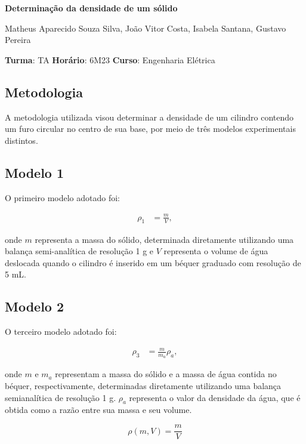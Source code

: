 \documentclass{article}
\begin{document}
\begin{center}
    \huge
    \textbf{Determinação da densidade de um sólido}
    \normalsize
    \vspace{10pt}

    Matheus Aparecido Souza Silva, João Vitor Costa, Isabela Santana, Gustavo Pereira
    \vspace{5pt}

    \textbf{Turma}: TA \textbf{Horário}: 6M23 \textbf{Curso}: Engenharia Elétrica
\end{center}

\begin{multicols}{2}

\section{Metodologia}

A metodologia utilizada visou determinar a densidade de um cilindro contendo um furo circular no centro de sua base, por meio de três modelos experimentais distintos.

\subsection{Modelo 1}
O primeiro modelo adotado foi:

\begin{align}
\rho_1 &= \frac{m}{V},
\end{align}

onde $m$ representa a massa do sólido, determinada diretamente utilizando uma balança semi-analítica de resolução 1 g e $V$ representa o volume de água deslocada quando o cilindro é inserido em um béquer graduado com resolução de 5 mL.

\subsection{Modelo 2}
O terceiro modelo adotado foi:

\begin{align}
\rho_3 &= \frac{m}{m_a} \rho_a,
\end{align}

onde $m$ e $m_a$ representam a massa do sólido e a massa de água contida no béquer, respectivamente, determinadas diretamente utilizando uma balança semianalítica de resolução 1 g. $\rho_a$ representa o valor da densidade da água, que é obtida como a razão entre sua massa e seu volume.

\begin{equation}
\rho(m, V) = \frac{m}{V}
\end{equation}


\end{multicols}
\end{document}
